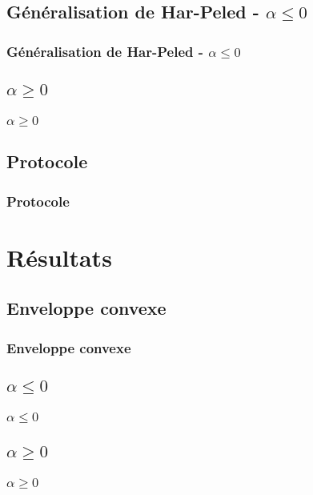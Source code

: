 \documentclass{beamer}
\begin{document}
\subsection{Généralisation de Har-Peled - $\alpha \leq 0$}
\begin{frame}
\frametitle{Généralisation de Har-Peled - $\alpha \leq 0$}

\end{frame}

\subsection{$\alpha \geq 0$}
\begin{frame}
\frametitle{$\alpha \geq 0$}
\end{frame}

\subsection{Protocole}
\begin{frame}
\frametitle{Protocole}
\end{frame}

\section{Résultats}

\subsection{Enveloppe convexe}
\begin{frame}
\frametitle{Enveloppe convexe}
\end{frame}

\subsection{$\alpha \leq 0$}
\begin{frame}
\frametitle{$\alpha \leq 0$}
\end{frame}

\subsection{$\alpha \geq 0$}
\begin{frame}
\frametitle{$\alpha \geq 0$}
\end{frame}
\end{document}
